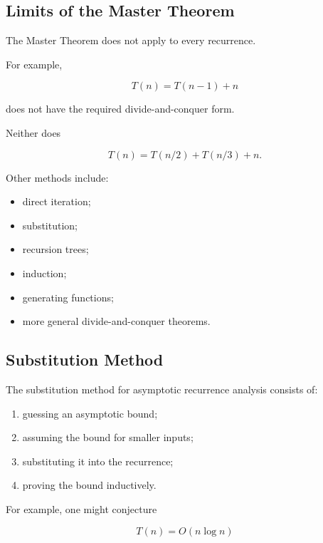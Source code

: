 \subsection{Limits of the Master Theorem}
\label{subsec:limits-master-theorem}

The Master Theorem does not apply to every recurrence.

For example,

\[
T(n)
=
T(n-1)+n
\]

does not have the required divide-and-conquer form.

Neither does

\[
T(n)
=
T(n/2)+T(n/3)+n.
\]

Other methods include:

\begin{itemize}
    \item direct iteration;
    \item substitution;
    \item recursion trees;
    \item induction;
    \item generating functions;
    \item more general divide-and-conquer theorems.
\end{itemize}

\subsection{Substitution Method}
\label{subsec:substitution-method-recurrence}

The substitution method for asymptotic recurrence analysis consists of:

\begin{enumerate}
    \item guessing an asymptotic bound;
    \item assuming the bound for smaller inputs;
    \item substituting it into the recurrence;
    \item proving the bound inductively.
\end{enumerate}

For example, one might conjecture

\[
T(n)=O(n\log n)
\]

